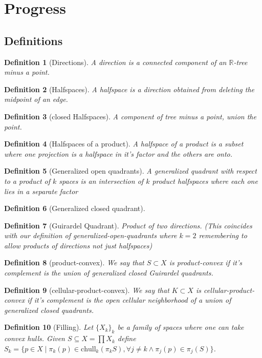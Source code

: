 \documentclass{article}
\theoremstyle{mystyle}
\newtheorem{defn}{Definition}
\theoremstyle{remark}
\begin{document}
\section{Progress}

\subsection{Definitions}

\begin{defn}[Directions] A {\em direction} is a connected component of an \(\mathbb{R}\)-tree minus a point. 
\end{defn}
\begin{defn}[Halfspaces] A halfspace is a direction obtained from deleting the midpoint of an edge.
\end{defn}
\begin{defn}[closed Halfspaces] A component of tree minus a point, union the point.
\end{defn}
\begin{defn}[Halfspaces of a product] A halfspace of a product is a subset where one projection is a halfspace in it's factor and the others are onto.
\end{defn}
\begin{defn}[Generalized open quadrants] A generalized quadrant with respect to a product of \(k\) spaces is an intersection of \(k\) product halfspaces where each one lies in a separate factor 
\end{defn}
\begin{defn}
    [Generalized closed quadrant]
\end{defn}
\begin{defn}
    [Guirardel Quadrant]
    Product of two directions. (This coincides with our definition of generalized-open-quadrants where \(k=2\) remembering to allow products of directions not just halfspaces)
\end{defn}
\begin{defn}[product-convex] We say that \(S\subset X\) is product-convex if it's complement is the union of generalized closed Guirardel quadrants.
\end{defn}
\begin{defn}[cellular-product-convex] We say that \(K \subset X\) is cellular-product-convex if it's complement is the open cellular neighborhood of a union of generalized closed quadrants.
\end{defn}

\begin{defn}
	[Filling]
	Let \(\{X_{k}\}_{k}\) be a family of spaces where one can take convex hulls. Given \(S \subseteq X = \prod X_{k}\) define \(S_{k} = \{p \in X \mid \pi_{k} (p) \in \text{chull}_{k}  (\pi_{k} S), \forall j\neq k \wedge \pi_{j} (p) \in \pi_{j} (S) \} \).
\end{defn}
\end{document}

